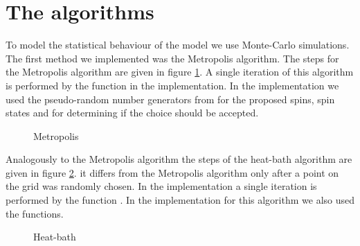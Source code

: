 \section{The algorithms}

To model the statistical behaviour of the model we use Monte-Carlo simulations. 
The first method we implemented was the Metropolis algorithm.
The steps for the Metropolis algorithm are given in figure \ref{alg:Metropolis}. A single iteration of this algorithm is performed by the function  in the implementation. In the implementation we used the pseudo-random number generators from  for the proposed spins, spin states and for determining if the choice should be accepted.

\begin{figure}
\centering
\begin{algorithm}[H]
\caption{Metropolis}
\label{alg:Metropolis}

\BlankLine
{}
\end{algorithm}
\end{figure}

Analogously to the Metropolis algorithm the steps of the heat-bath algorithm are given in figure \ref{alg:heat-bath}. it differs from the Metropolis algorithm only after a point on the grid was randomly chosen. In the implementation a single iteration is performed by the function . In the implementation for this algorithm we also used the  functions.

\begin{figure}
\centering
\begin{algorithm}[H]
\caption{Heat-bath}
\label{alg:heat-bath}

\BlankLine
{}
\end{algorithm}
\end{figure}

